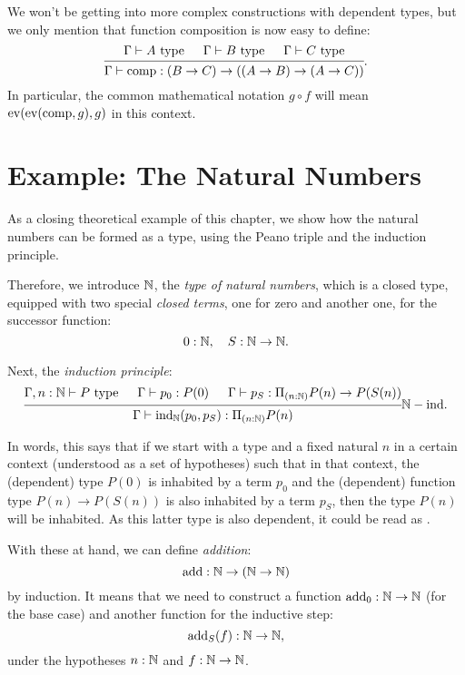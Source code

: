 We won't be getting into more complex constructions with dependent types,
but we only mention that function composition is now easy to define:
\[
  \begin{prooftree}
    \hypo{\Gamma \vdash A \text{ type}}
    \hypo{\Gamma \vdash B \text{ type}}
    \hypo{\Gamma \vdash C \text{ type}}
    \infer3{\Gamma \vdash \dr{comp} : (B \to C) \to ((A \to B) \to (A \to C))}
  \end{prooftree}.
\]
In particular, the common mathematical notation $ g \circ f $ will
mean $ \mathrm{ev}(\mathrm{ev}(\mathrm{comp},g),g) $ in this context.

\section{Example: The Natural Numbers}
\label{sec:nat-ind}

As a closing theoretical example of this chapter, we show how the natural
numbers can be formed as a type, using the Peano triple and the induction
principle.

Therefore, we introduce $ \mathbb{N} $, the \emph{type of natural numbers}, which
is a closed type, equipped with two special \emph{closed terms}, one for
zero and another one, for the successor function:
\[
  0 : \mathbb{N}, \quad S : \mathbb{N} \to \mathbb{N}.
\]

Next, the \emph{induction principle}:
\[
  \begin{prooftree}
    \hypo{\Gamma, n : \NN \vdash P \text{ type}}
    \hypo{\Gamma \vdash p_0 : P(0)}
    \hypo{\Gamma \vdash p_S : \Pi_{(n : \NN)} P(n) \to P(S(n))}
    \infer3{\Gamma \vdash \dr{ind}_{\NN} (p_0, p_S) : \Pi_{(n : \NN)} P(n)}.
  \end{prooftree}\NN-\text{ind}.
\]

In words, this says that if we start with a type and a fixed natural $ n $
in a certain context (understood as a set of hypotheses) such that
in that context, the (dependent) type $ P(0) $ is inhabited by
a term $ p_0 $ and the (dependent) function type $ P(n) \to P(S(n)) $
is also inhabited by a term $ p_S $, then the type $ P(n) $ will
be inhabited. As this latter type is also dependent, it could be
read as .

With these at hand, we can define \emph{addition}:
\[
  \mathrm{add} : \mathbb{N} \to (\mathbb{N} \to \mathbb{N})
\]
by induction. It means that we need to construct a function
$ \mathrm{add}_0 : \mathbb{N} \to \mathbb{N} $ (for the base case) and another
function for the inductive step:
\[
  \mathrm{add}_S(f) : \mathbb{N} \to \mathbb{N},
\]
under the hypotheses $ n : \mathbb{N} $ and $ f : \mathbb{N} \to \mathbb{N} $.

